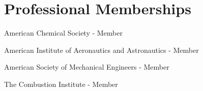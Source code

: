 \section{{\sectionfont Professional Memberships}}
American Chemical Society - Member

American Institute of Aeronautics and Astronautics - Member

American Society of Mechanical Engineers - Member

The Combustion Institute - Member



